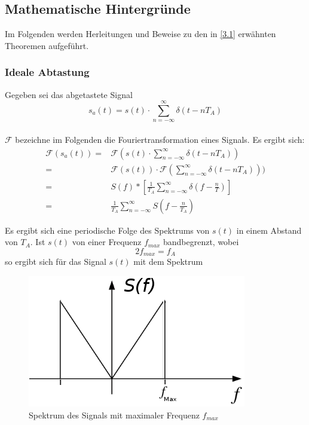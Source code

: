 \subsection{Mathematische Hintergründe}\label{3.2}
Im Folgenden werden Herleitungen und Beweise zu den in \ref{3.1} erwähnten Theoremen aufgeführt.

\subsubsection{Ideale Abtastung}
Gegeben sei das abgetastete Signal\\
$$s_a(t) = s(t) \cdot \sum_{n=-\infty}^{\infty} \delta(t - nT_A)$$\\
$\mathcal{F}$ bezeichne im Folgenden die Fouriertransformation eines Signals. Es ergibt sich:\\
\begin{equation}
\begin{aligned}
\mathcal{F}(s_a(t)) = &  \mathcal{F}(s(t) \cdot \sum\limits_{n=-\infty}^{\infty} \delta(t - nT_A)) \\
= & \mathcal{F}(s(t)) \cdot \mathcal{F}(\sum\limits_{n=-\infty}^{\infty} \delta(t - nT_A))) \\
= & S(f) * \left[ \frac{1}{T_A} \sum_{n = -\infty} ^ {\infty} \delta \left( f - \frac{n}{T} \right) \right] \\
= & \frac{1}{T_A} \sum_{n = -\infty} ^ {\infty} S\left( f - \frac{n}{T_A} \right)
\end{aligned}
\end{equation}



Es ergibt sich eine periodische Folge des Spektrums von $s(t)$ in einem Abstand von $T_A$. Ist $s(t)$ von einer Frequenz $f_{max}$ bandbegrenzt, wobei $$2f_{max} = f_A $$ 
so ergibt sich für das Signal $s(t)$ mit dem Spektrum

\begin{figure}[h!]
\centering
\includegraphics[scale=0.4]{images/fmax.png}
\caption{Spektrum des Signals mit maximaler Frequenz $f_{max}$}
\label{fmax}
\end{figure}

